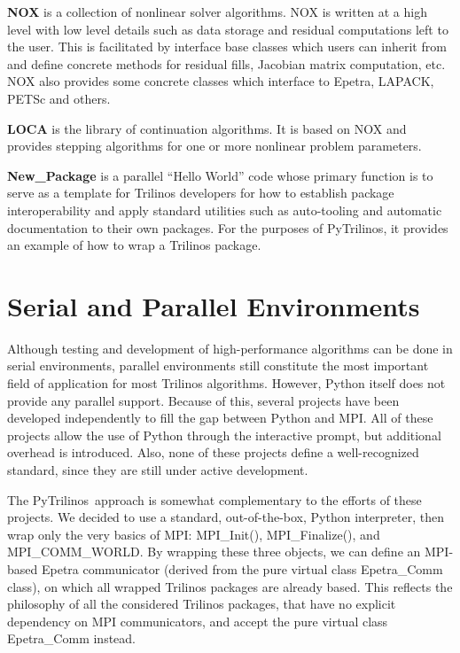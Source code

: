 \documentclass{llncs}
\newcommand{\PyTrilinos}{{\sc PyTrilinos}}
\begin{document}
\smallskip

\noindent
{\bf NOX} is a collection of nonlinear solver algorithms.  NOX
  is written at a high level with low level details such as data
  storage and residual computations left to the user.  This is
  facilitated by interface base classes which users can inherit from
  and define concrete methods for residual fills, Jacobian matrix
  computation, etc.  NOX also provides some concrete classes which
  interface to Epetra, LAPACK, PETSc and others.

\smallskip
\noindent
{\bf LOCA} is the library of continuation algorithms.  It is
  based on NOX and provides stepping algorithms for one or more
  nonlinear problem parameters.

\smallskip
\noindent
{\bf New\_Package} is a parallel ``Hello World'' code whose
  primary function is to serve as a template for Trilinos developers
  for how to establish package interoperability and apply standard
  utilities such as auto-tooling and
  automatic documentation to their own packages.  For the purposes of
  \PyTrilinos, it provides an example of how to wrap a Trilinos
  package.

\section{Serial and Parallel Environments}
\label{sec:serial}

Although testing and development of high-performance algorithms can be
done in serial environments, parallel environments still constitute
the most important field of application for most Trilinos algorithms.
However, Python itself does not provide any parallel support.  Because
of this, several projects have been developed independently to fill
the gap between Python and MPI. 
All of these projects allow the use of Python through the interactive
prompt, but additional overhead is introduced.  Also, none of these
projects define a well-recognized standard, since they are still under
active development.

The \PyTrilinos\ approach is somewhat complementary to the efforts of these
projects.  We decided to use a standard, out-of-the-box, Python
interpreter, then wrap only the very basics of MPI: MPI\_Init(),
MPI\_Finalize(), and MPI\_COMM\_WORLD.  By wrapping these three
objects, we can define an MPI-based Epetra communicator (derived from
the pure virtual class Epetra\_Comm class), on which all wrapped
Trilinos packages are already based.  This reflects the philosophy of
all the considered Trilinos packages, that have no explicit dependency
on MPI communicators, and accept the pure virtual class Epetra\_Comm
instead. 
\end{document}
